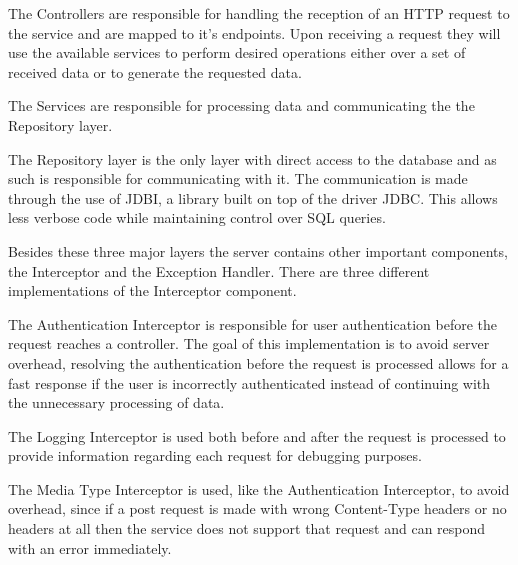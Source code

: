 The Controllers are responsible for handling the reception of an HTTP request to the service and are mapped to
it's endpoints. Upon receiving a request they will use the available services to perform desired operations either
over a set of received data or to generate the requested data.

The Services are responsible for processing data and communicating the the Repository layer.

The Repository layer is the only layer with direct access to the database and as such is responsible for communicating
with it. The communication is made through the use of JDBI\cite{jdbidocs}, a library built on top of the driver JDBC\cite{jdbcdocs}. This allows
less verbose code while maintaining control over SQL queries. 

Besides these three major layers the server contains other important components, the Interceptor\cite{springinterceptor} and the Exception Handler\cite{springexception}.
There are three different implementations of the Interceptor component.

The Authentication Interceptor is responsible for user authentication before the request reaches a controller. The goal of this
implementation is to avoid server overhead, resolving the authentication before the request is processed allows for a fast response
if the user is incorrectly authenticated instead of continuing with the unnecessary processing of data.

The Logging Interceptor is used both before and after the request is processed to provide information 
regarding each request for debugging purposes.

The Media Type Interceptor is used, like the Authentication Interceptor, to avoid overhead, since if a post request is made
with wrong Content-Type headers or no headers at all then the service does not support that request and can respond with an 
error immediately.

